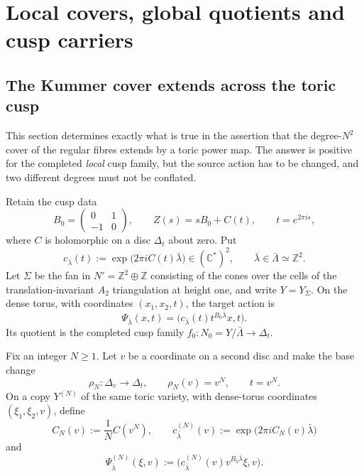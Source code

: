 \section{Local covers, global quotients and cusp carriers}\label{sec:III:carriers}

\subsection{The Kummer cover extends across the toric cusp}
\label{wb:cusp-cover-section}

This section determines exactly what is true in the assertion that the
degree-$N^2$ cover of the regular fibres extends by a toric power map.  The
answer is positive for the completed \emph{local} cusp family, but the source
action has to be changed, and two different degrees must not be conflated.

Retain the cusp data
\[
 B_0=\begin{pmatrix}0&1\\-1&0\end{pmatrix},\qquad
 Z(s)=sB_0+C(t),\qquad t=e^{2\pi i s},
\]
where $C$ is holomorphic on a disc $\Delta_t$ about zero.  Put
\[
 c_{\bar\lambda}(t)
 :=\exp\!\bigl(2\pi iC(t)\bar\lambda\bigr)
 \in(\mathbb C^*)^2,
 \qquad \bar\lambda\in\bar\Lambda\simeq\mathbb Z^2.
\]
Let $\Sigma$ be the fan in
$N'=\mathbb Z^2\oplus\mathbb Z$ consisting of the cones over the cells of
the translation-invariant $A_2$ triangulation at height one, and write
$Y=Y_\Sigma$.  On the dense torus, with coordinates $(x_1,x_2,t)$, the
target action is
\begin{equation}
 \Psi_{\bar\lambda}(x,t)
 =\bigl(c_{\bar\lambda}(t)t^{B_0\bar\lambda}x,t\bigr).
 \label{wb:cusp-cover-target-action}
\end{equation}
Its quotient is the completed cusp family
$f_0\colon N_0=Y/\bar\Lambda\to\Delta_t$.

Fix an integer $N\geq1$.  Let $v$ be a coordinate on a second disc and
make the base change
\begin{equation}
 \rho_N\colon\Delta_v\longrightarrow\Delta_t,\qquad
 \rho_N(v)=v^N,\qquad t=v^N.
 \label{wb:cusp-cover-base-change}
\end{equation}
On a copy $Y^{(N)}$ of the same toric variety, with dense-torus coordinates
$(\xi_1,\xi_2,v)$, define
\begin{equation}
 C_N(v):=\frac1N C(v^N),\qquad
 c^{(N)}_{\bar\lambda}(v)
 :=\exp\!\bigl(2\pi iC_N(v)\bar\lambda\bigr)
 \label{wb:cusp-cover-source-factor}
\end{equation}
and
\begin{equation}
 \Psi^{(N)}_{\bar\lambda}(\xi,v)
 :=\bigl(c^{(N)}_{\bar\lambda}(v)
          v^{B_0\bar\lambda}\xi,v\bigr).
 \label{wb:cusp-cover-source-action}
\end{equation}

